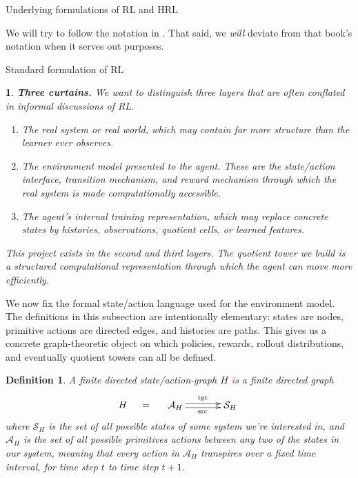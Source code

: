 \documentclass[11pt]{article}
\newtheorem{definition}[subsubsection]{Definition}
\newtheorem{ermark}[subsubsection]{}
\begin{document}
\begin{section}{Underlying formulations of RL and HRL}

We will try to follow the notation in \cite[pp. xix-xxii]{SBRL}. That said, we {\em will} deviate from that book's notation when it serves out purposes.

\begin{subsection}{Standard formulation of RL}

\begin{ermark}
{\bf Three curtains.}
\normalfont
We want to distinguish three layers that are often conflated in informal discussions of RL. 
\begin{enumerate}
\item
The {\em real system} or {\em real world}, which may contain far more structure than the learner ever observes. 
\item
The {\em environment model} presented to the agent. These are the state/action interface, transition mechanism, and reward mechanism through which the real system is made computationally accessible. 
\item
{\em The agent's internal training representation}, which may replace concrete states by histories, observations, quotient cells, or learned features. 
\end{enumerate}
This project exists in the second and third layers. The quotient tower we build is a structured computational representation through which the agent can move more efficiently.
\end{ermark}

We now fix the formal state/action language used for the environment model. The definitions in this subsection are intentionally elementary: states are nodes, primitive actions are directed edges, and histories are paths. This gives us a concrete graph-theoretic object on which policies, rewards, rollout distributions, and eventually quotient towers can all be defined.
 
\begin{definition}
\normalfont
A {\em finite directed  state/action-graph} $H$ \textcolor{red} is a finite directed graph
\begin{equation}\label{eq:H src tgt}
H\;\quad=\quad\;
\begin{xy}
(0,0)*+{\mathcal{A}_{H}}="1";
(20,0)*+{\mathcal{S}_{H}}="2";
{\ar@<2pt>^{\text{tgt}} "1"; "2"}
{\ar@<-2pt>_{\text{src}} "1"; "2"}
\end{xy}
\end{equation}
where $\mathcal{S}_{H}$ is the set of all possible states of some system we're interested in, and $\mathcal{A}_{H}$ is the set of all possible primitives actions between any two of the states in our system, meaning that every action in $\mathcal{A}_{H}$ transpires over a fixed time interval, for time step $t$ to time step $t+1$.


\end{definition}
\end{subsection}
\end{section}
\end{document}
